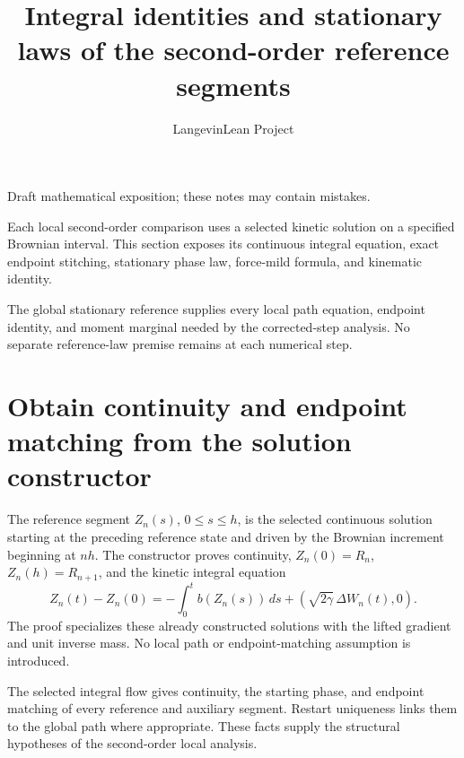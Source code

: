 \documentclass[11pt,a4paper]{article}
\title{\texorpdfstring{Integral identities and stationary laws of the second-order reference segments}{Integral identities and stationary laws of the second-order reference segments}}
\author{LangevinLean Project}
\date{}
\begin{document}
\maketitle
Draft mathematical exposition; these notes may contain mistakes.


Each local second-order comparison uses a selected kinetic solution on a specified Brownian interval. This section exposes its continuous integral equation, exact endpoint stitching, stationary phase law, force-mild formula, and kinematic identity.



The global stationary reference supplies every local path equation, endpoint identity, and moment marginal needed by the corrected-step analysis. No separate reference-law premise remains at each numerical step.


\section{\texorpdfstring{Obtain continuity and endpoint matching from the solution constructor}{Obtain continuity and endpoint matching from the solution constructor}}


The reference segment \(Z_n(s)\), \(0\le s\le h\), is the selected continuous solution starting at the preceding reference state and driven by the Brownian increment beginning at \(nh\). The constructor proves continuity, \(Z_n(0)=R_n\), \(Z_n(h)=R_{n+1}\), and the kinetic integral equation \[Z_n(t)-Z_n(0)=-\int_0^tb(Z_n(s))\,ds+(\sqrt{2\gamma}\,\Delta W_n(t),0).\] The proof specializes these already constructed solutions with the lifted gradient and unit inverse mass. No local path or endpoint-matching assumption is introduced.



The selected integral flow gives continuity, the starting phase, and endpoint matching of every reference and auxiliary segment. Restart uniqueness links them to the global path where appropriate. These facts supply the structural hypotheses of the second-order local analysis.
\end{document}
